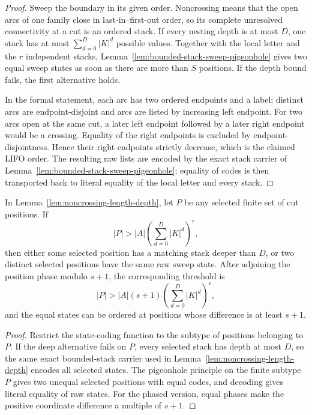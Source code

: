 \begin{proof}
Sweep the boundary in its given order.  Noncrossing means that the open arcs
of one family close in last-in--first-out order, so its complete unresolved
connectivity at a cut is an ordered stack.  If every nesting depth is at most
$D$, one stack has at most
$\sum_{d=0}^{D}|K|^d$ possible values.  Together with the local letter and the
$r$ independent stacks, Lemma~\ref{lem:bounded-stack-sweep-pigeonhole} gives
two equal sweep states as soon as there are more than $S$ positions.  If the
depth bound fails, the first alternative holds.

In the formal statement, each arc has two ordered endpoints and a label;
distinct arcs are endpoint-disjoint and arcs are listed by increasing left
endpoint.  For two arcs open at the same cut, a later left endpoint followed
by a later right endpoint would be a crossing.  Equality of the right
endpoints is excluded by endpoint-disjointness.  Hence their right endpoints
strictly decrease, which is the claimed LIFO order.  The resulting raw lists
are encoded by the exact stack carrier of
Lemma~\ref{lem:bounded-stack-sweep-pigeonhole}; equality of codes is then
transported back to literal equality of the local letter and every stack.
\end{proof}

\begin{lemma}
\label{lem:restricted-noncrossing-sweep}
In Lemma~\ref{lem:noncrossing-length-depth}, let $P$ be any selected finite
set of cut positions.  If
\[
 |P|>|A|\left(\sum_{d=0}^{D}|K|^d\right)^r,
\]
then either some selected position has a matching stack deeper than $D$, or
two distinct selected positions have the same raw sweep state.  After
adjoining the position phase modulo $s+1$, the corresponding threshold is
\[
 |P|>|A|(s+1)\left(\sum_{d=0}^{D}|K|^d\right)^r,
\]
and the equal states can be ordered at positions whose difference is at
least $s+1$.
\end{lemma}

\begin{proof}
Restrict the state-coding function to the subtype of positions belonging to
$P$.  If the deep alternative fails on $P$, every selected stack has depth
at most $D$, so the same exact bounded-stack carrier used in
Lemma~\ref{lem:noncrossing-length-depth} encodes all selected states.  The
pigeonhole principle on the finite subtype $P$ gives two unequal selected
positions with equal codes, and decoding gives literal equality of raw
states.  For the phased version, equal phases make the positive coordinate
difference a multiple of $s+1$.
\end{proof}

